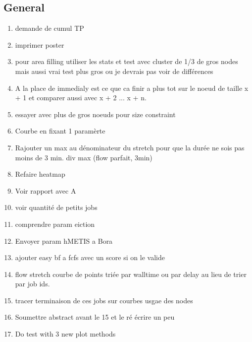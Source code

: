 \documentclass[a4paper]{article}
\begin{document}
	\subsection{General}
		\begin{enumerate}
			\item demande de cumul TP
			\item imprimer poster
			\item pour area filling utiliser les stats et test avec cluster de 1/3 de gros nodes mais aussi vrai test plus gros ou je devrais pas voir de différences
			\item A la place de immedialy est ce que ca finir a plus tot sur le noeud de taille x + 1 et comparer aussi avec x + 2 ... x + n.
			\item essayer avec plus de gros noeuds pour size constraint
			\item Courbe en fixant 1 paramèrte
			\item Rajouter un max au dénominateur du stretch pour que la durée ne sois pas moins de 3 min. div max (flow parfait, 3min)
			\item Refaire heatmap
			\item Voir rapport avec A
			\item voir quantité de petits jobs
			\item comprendre param eiction	
			\item Envoyer param hMETIS a Bora
			\item ajouter easy bf a fcfs avec un score si on le valide
								
			\item flow stretch courbe de points triée par walltime ou par delay au lieu de trier par job ids.
						
			\item tracer terminaison de ces jobs sur courbes usgae des nodes
			
			\item Soumettre abstract avant le 15 et le ré écrire un peu
		
			\item Do test with 3 new plot methods
						

\end{enumerate}
\end{document}
